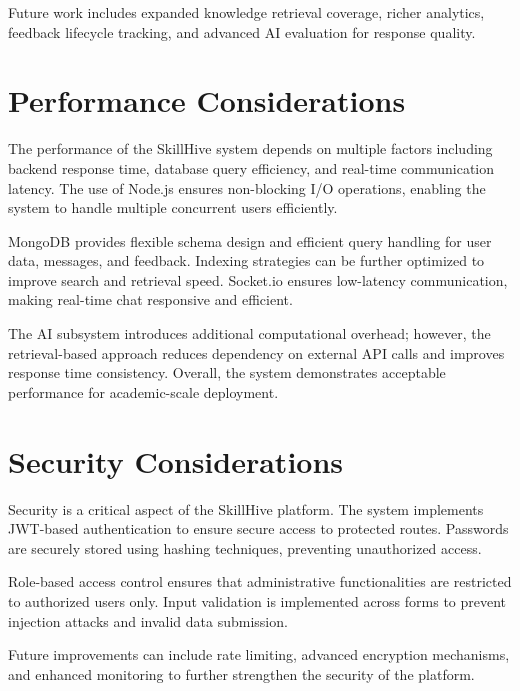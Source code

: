 \documentclass[conference]{IEEEtran}
\begin{document}
Future work includes expanded knowledge retrieval coverage, richer analytics, feedback lifecycle tracking, and advanced AI evaluation for response quality.

\section{Performance Considerations}
The performance of the SkillHive system depends on multiple factors including backend response time, database query efficiency, and real-time communication latency. The use of Node.js ensures non-blocking I/O operations, enabling the system to handle multiple concurrent users efficiently.

MongoDB provides flexible schema design and efficient query handling for user data, messages, and feedback. Indexing strategies can be further optimized to improve search and retrieval speed. Socket.io ensures low-latency communication, making real-time chat responsive and efficient.

The AI subsystem introduces additional computational overhead; however, the retrieval-based approach reduces dependency on external API calls and improves response time consistency. Overall, the system demonstrates acceptable performance for academic-scale deployment.

\section{Security Considerations}
Security is a critical aspect of the SkillHive platform. The system implements JWT-based authentication to ensure secure access to protected routes. Passwords are securely stored using hashing techniques, preventing unauthorized access.

Role-based access control ensures that administrative functionalities are restricted to authorized users only. Input validation is implemented across forms to prevent injection attacks and invalid data submission.

Future improvements can include rate limiting, advanced encryption mechanisms, and enhanced monitoring to further strengthen the security of the platform.
\end{document}
